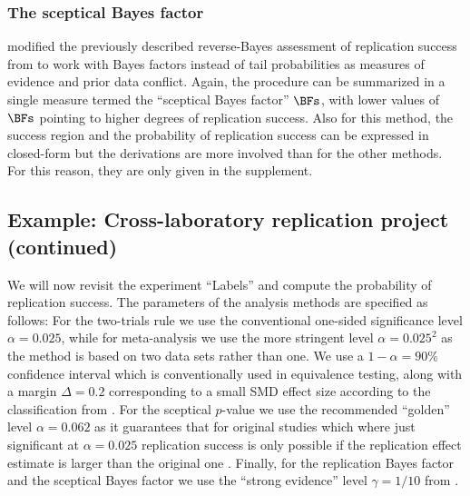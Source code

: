 \subsubsection{The sceptical Bayes factor}
\citet{Pawel2022b} modified the previously described reverse-Bayes assessment of
replication success from \citet{Held2020} to work with Bayes factors instead of
tail probabilities as measures of evidence and prior data conflict. Again, the
procedure can be summarized in a single measure termed the ``sceptical Bayes
factor'' $\BFs$, with lower values of $\BFs$ pointing to higher degrees of
replication success. Also for this method, the success region and the
probability of replication success can be expressed in closed-form but the
derivations are more involved than for the other methods. For this reason, they
are only given in the supplement.

\subsection{Example: Cross-laboratory replication project (continued)}

%

We will now revisit the experiment ``Labels'' %
and compute the probability of replication success.
The parameters of the analysis methods are specified as follows: For the
two-trials rule we use the conventional one-sided significance level
$\alpha = 0.025$, while for meta-analysis we use the more
stringent level $\alpha = 0.025^{2}$ as the
method is based on two data sets rather than one. We use a
$1 - \alpha = 90\%$ confidence interval which is
conventionally used in equivalence testing, along with a margin
$\Delta = 0.2$ corresponding to a small SMD effect size according to
the classification from \citet{Cohen1992}. For the sceptical $p$-value we use
the recommended ``golden'' level $\alpha = 0.062$ as it
guarantees that for original studies which where just significant at
$\alpha = 0.025$ replication success is only possible if the replication effect
estimate is larger than the original one \citep{Held2021}. Finally, for the
replication Bayes factor and the sceptical Bayes factor we use the ``strong
evidence'' level $\gamma = 1/10$ from \citet{Jeffreys1961}.


